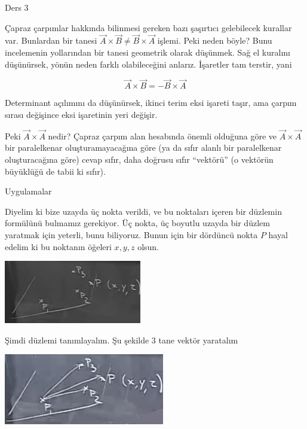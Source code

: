 \documentclass[12pt,fleqn]{article}\usepackage{../../common}
\begin{document}
Ders 3

Çapraz çarpımlar hakkında bilinmesi gereken bazı şaşırtıcı gelebilecek
kurallar var. Bunlardan bir tanesi $\vec{A} \times \vec{B} \ne \vec{B}
\times \vec{A}$ işlemi. Peki neden böyle? Bunu incelemenin yollarından bir 
tanesi 
geometrik olarak düşünmek. Sağ el kuralını düşünürsek, yönün neden 
farklı olabileceğini anlarız. İşaretler tam terstir, yani

$$  \vec{A} \times \vec{B} = - \vec{B}\times \vec{A} $$

Determinant açılımını da düşünürsek, ikinci terim eksi işareti taşır, ama
çarpım sırası değişince eksi işaretinin yeri değişir. 

Peki $\vec{A} \times \vec{A}$ nedir? Çapraz çarpım alan hesabında önemli
olduğuna göre ve $\vec{A} \times \vec{A}$ bir paralelkenar
oluşturamayacağına göre (ya da sıfır alanlı bir paralelkenar oluşturacağına
göre) cevap sıfır, daha doğrusu sıfır ``vektörü'' (o vektörün büyüklüğü de
tabii ki sıfır).

Uygulamalar

Diyelim ki bize uzayda üç nokta verildi, ve bu noktaları içeren bir düzlemin
formülünü bulmamız gerekiyor. Üç nokta, üç boyutlu uzayda bir düzlem yaratmak
için yeterli, bunu biliyoruz. Bunun için bir dördüncü nokta $P$ hayal
edelim ki bu noktanın öğeleri $x,y,z$ olsun.


\begin{center}


\includegraphics[width=6cm]{3_1.png}


\end{center}


Şimdi düzlemi tanımlayalım. Şu şekilde 3 tane vektör yaratalım


\begin{center}


\includegraphics[width=7cm]{3_2.png}


\end{center}
\end{document}
